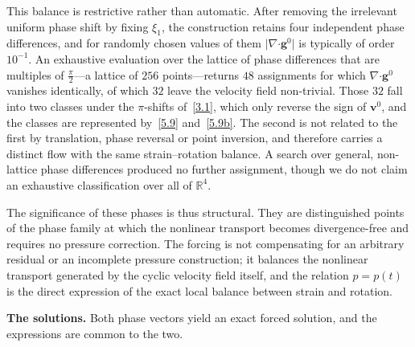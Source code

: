 \documentclass[11pt]{jfm}
\providecommand\bcdot{\boldsymbol{\cdot}}
\numberwithin{equation}{section}
\begin{document}
This balance is restrictive rather than automatic. After removing the irrelevant uniform phase
shift by fixing $\xi_1$, the construction retains four independent phase differences, and for
randomly chosen values of them $\lvert\nabla\bcdot\boldsymbol{g}^0\rvert$ is typically of order
$10^{-1}$. An exhaustive evaluation over the lattice of phase differences that are multiples of
$\tfrac{\pi}{2}$---a lattice of $256$ points---returns $48$ assignments for which
$\nabla\bcdot\boldsymbol{g}^0$ vanishes identically, of which $32$ leave the velocity field
non-trivial. Those $32$ fall into two classes under the $\pi$-shifts of~\eqref{3.1}, which only
reverse the sign of $\boldsymbol{v}^0$, and the classes are represented by~\eqref{5.9}
and~\eqref{5.9b}. The second is not related to the first by translation, phase reversal or point
inversion, and therefore carries a distinct flow with the same strain--rotation balance. A search
over general, non-lattice phase differences produced no further assignment, though we do not claim
an exhaustive classification over all of $\mathbb{R}^4$.

The significance of these phases is thus structural. They are distinguished points of the phase
family at which the nonlinear transport becomes divergence-free and requires no pressure
correction. The forcing is not compensating for an arbitrary residual or an incomplete pressure
construction; it balances the nonlinear transport generated by the cyclic velocity field itself,
and the relation $p=p(t)$ is the direct expression of the exact local balance between strain and
rotation.

\medskip
\noindent\textbf{The solutions.} Both phase vectors yield an exact forced solution, and the
expressions are common to the two.
\end{document}
